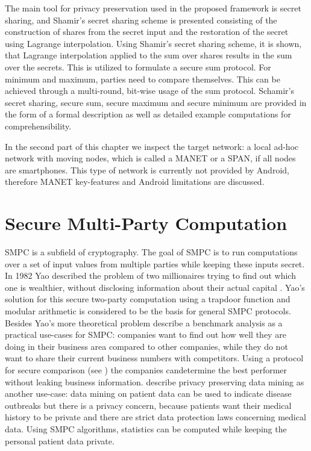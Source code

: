 The main tool for privacy preservation used in the proposed framework is secret sharing, and Shamir's secret sharing scheme is presented consisting of the construction of shares from the secret input and the restoration of the secret using Lagrange interpolation. Using Shamir's secret sharing scheme, it is shown, that Lagrange interpolation applied to the sum over shares results in the sum over the secrets. This is utilized to formulate a secure sum protocol. For minimum and maximum, parties need to compare themselves. This can be achieved through a multi-round, bit-wise usage of the sum protocol. Schamir's secret sharing, secure sum, secure maximum and secure minimum are provided in the form of a formal description as well as detailed example computations for comprehensibility.

In the second part of this chapter we inspect the target network: a local ad-hoc network with moving nodes, which is called a \gls{MANET} or a \gls{SPAN}, if all nodes are smartphones. This type of network is currently not provided by Android, therefore \gls{MANET} key-features and Android limitations are discussed. 

\section{Secure Multi-Party Computation} \label{Secure Multi-Party Computation}

\gls{SMPC} is a subfield of cryptography. The goal of \gls{SMPC} is to run computations over a set of input values from multiple parties while keeping these inputs secret. In 1982 Yao described the problem of two millionaires trying to find out which one is wealthier, without disclosing information about their actual capital \autocite{Yao1982}. Yao's solution for this secure two-party computation using a trapdoor function and modular arithmetic is considered to be the basis for general \gls{SMPC} protocols.
Besides Yao's more theoretical problem \textcite{Cramer2015} describe a benchmark analysis as a practical use-cases for \gls{SMPC}: companies want to find out how well they are doing in their business area compared to other companies, while they do not want to share their current business numbers with competitors. Using a protocol for secure comparison (see ) the companies candetermine the best performer without leaking business information. 
\textcite{Clifton2002} describe privacy preserving data mining as another use-case: data mining on patient data can be used to indicate disease outbreaks but there is a privacy concern, because patients want their medical history to be private and there are strict data protection laws concerning medical data. Using \gls{SMPC} algorithms, statistics can be computed while keeping the personal patient data private.

